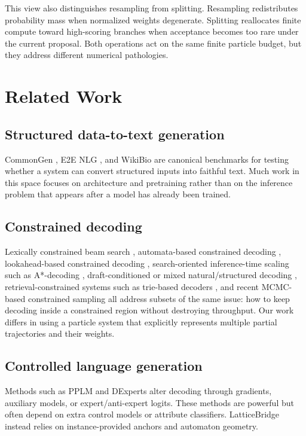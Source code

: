 \documentclass[11pt]{article}
\begin{document}
This view also distinguishes resampling from splitting. Resampling redistributes probability mass when normalized weights degenerate. Splitting reallocates finite compute toward high-scoring branches when acceptance becomes too rare under the current proposal. Both operations act on the same finite particle budget, but they address different numerical pathologies.

\section{Related Work}
\subsection{Structured data-to-text generation}
CommonGen \citep{lin2020commongen}, E2E NLG \citep{novikova2017e2e,dusek2019semantic}, and WikiBio \citep{lebret2016generating} are canonical benchmarks for testing whether a system can convert structured inputs into faithful text. Much work in this space focuses on architecture and pretraining rather than on the inference problem that appears after a model has already been trained.

\subsection{Constrained decoding}
Lexically constrained beam search \citep{hokamp2017lexically,post2018fast}, automata-based constrained decoding \citep{koo2024automata}, lookahead-based constrained decoding \citep{lu2022neurologic}, search-oriented inference-time scaling such as A*-decoding \citep{chatziveroglou2025astar}, draft-conditioned or mixed natural/structured decoding \citep{reddy2026draft,nguyen2026thinking}, retrieval-constrained systems such as trie-based decoders \citep{su2026vectorizing}, and recent MCMC-based constrained sampling \citep{anaya2025constrained} all address subsets of the same issue: how to keep decoding inside a constrained region without destroying throughput. Our work differs in using a particle system that explicitly represents multiple partial trajectories and their weights.

\subsection{Controlled language generation}
Methods such as PPLM \citep{dathathri2020pplm} and DExperts \citep{liu2021dexperts} alter decoding through gradients, auxiliary models, or expert/anti-expert logits. These methods are powerful but often depend on extra control models or attribute classifiers. LatticeBridge instead relies on instance-provided anchors and automaton geometry.
\end{document}
